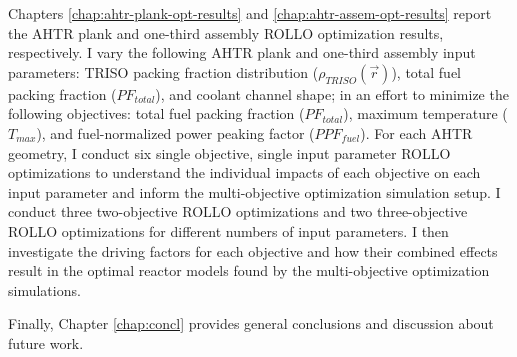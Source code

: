 Chapters \ref{chap:ahtr-plank-opt-results} and \ref{chap:ahtr-assem-opt-results} 
report the \gls{AHTR} plank and one-third assembly \gls{ROLLO} optimization results, 
respectively. 
I vary the following \gls{AHTR} plank and one-third assembly input parameters: 
\gls{TRISO} packing fraction distribution ($\rho_{TRISO}(\vec{r})$), total fuel 
packing fraction ($PF_{total}$), and coolant channel shape; in an effort to minimize 
the following objectives: total fuel packing fraction ($PF_{total}$), maximum 
temperature ($T_{max}$), and fuel-normalized power peaking factor ($PPF_{fuel}$). 
For each \gls{AHTR} geometry, I conduct six single objective, single input parameter 
\gls{ROLLO} optimizations to understand the individual impacts of each objective on 
each input parameter and inform the multi-objective optimization simulation setup. 
I conduct three two-objective \gls{ROLLO} optimizations and two three-objective 
\gls{ROLLO} optimizations for different numbers of input parameters. 
I then investigate the driving factors for each objective and how their combined 
effects result in the optimal reactor models found by the multi-objective 
optimization simulations. 

Finally, Chapter \ref{chap:concl} provides general conclusions and discussion about 
future work. 